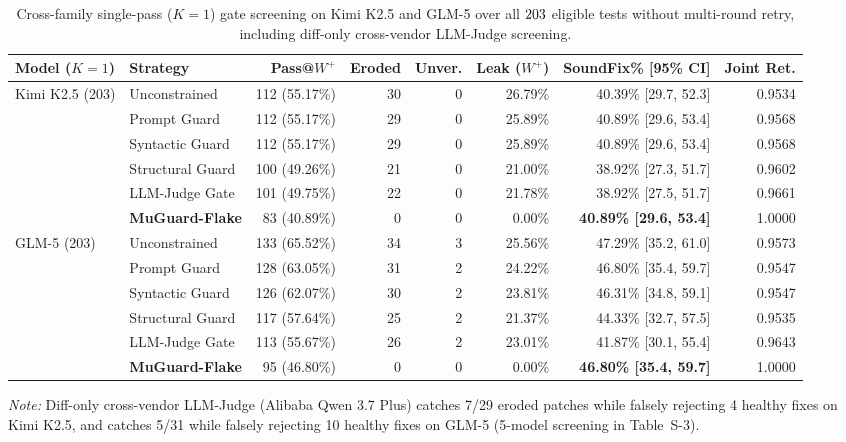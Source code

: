 \begin{table}[t]
\centering
\scriptsize
\setlength{\tabcolsep}{3.3pt}
\caption{Cross-family single-pass ($K=1$) gate screening on Kimi K2.5 and GLM-5 over all $203$ eligible tests without multi-round retry, including diff-only cross-vendor LLM-Judge screening.}
\label{tab:crossfamily_r1}
\begin{tabular}{llrrrrrr}
\toprule
Model ($K=1$) & Strategy & Pass@$W^+$ & Eroded & Unver. & Leak ($W^+$) & SoundFix\% [95\% CI] & Joint Ret. \\
\midrule
Kimi K2.5 (203) & Unconstrained & 112 (55.17\%) & 30 & 0 & 26.79\% & 40.39\% [29.7, 52.3] & 0.9534 \\
 & Prompt Guard & 112 (55.17\%) & 29 & 0 & 25.89\% & 40.89\% [29.6, 53.4] & 0.9568 \\
 & Syntactic Guard & 112 (55.17\%) & 29 & 0 & 25.89\% & 40.89\% [29.6, 53.4] & 0.9568 \\
 & Structural Guard & 100 (49.26\%) & 21 & 0 & 21.00\% & 38.92\% [27.3, 51.7] & 0.9602 \\
 & LLM-Judge Gate & 101 (49.75\%) & 22 & 0 & 21.78\% & 38.92\% [27.5, 51.7] & 0.9661 \\
 & \textbf{MuGuard-Flake} & 83 (40.89\%) & 0 & 0 & 0.00\% & \textbf{40.89\% [29.6, 53.4]} & 1.0000 \\
\midrule
GLM-5 (203) & Unconstrained & 133 (65.52\%) & 34 & 3 & 25.56\% & 47.29\% [35.2, 61.0] & 0.9573 \\
 & Prompt Guard & 128 (63.05\%) & 31 & 2 & 24.22\% & 46.80\% [35.4, 59.7] & 0.9547 \\
 & Syntactic Guard & 126 (62.07\%) & 30 & 2 & 23.81\% & 46.31\% [34.8, 59.1] & 0.9547 \\
 & Structural Guard & 117 (57.64\%) & 25 & 2 & 21.37\% & 44.33\% [32.7, 57.5] & 0.9535 \\
 & LLM-Judge Gate & 113 (55.67\%) & 26 & 2 & 23.01\% & 41.87\% [30.1, 55.4] & 0.9643 \\
 & \textbf{MuGuard-Flake} & 95 (46.80\%) & 0 & 0 & 0.00\% & \textbf{46.80\% [35.4, 59.7]} & 1.0000 \\
\bottomrule
\end{tabular}
\par\smallskip\parbox{0.96\textwidth}{\scriptsize\textit{Note:} Diff-only cross-vendor LLM-Judge (Alibaba Qwen 3.7 Plus) catches 7/29 eroded patches while falsely rejecting 4 healthy fixes on Kimi K2.5, and catches 5/31 while falsely rejecting 10 healthy fixes on GLM-5 (5-model screening in Table~S-3).}
\end{table}
